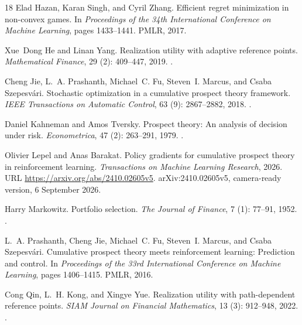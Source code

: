\documentclass[11pt]{article}
\newcommand{\1}{\mathbf 1}
\theoremstyle{definition}
\begin{document}
\begin{thebibliography}{18}
Elad Hazan, Karan Singh, and Cyril Zhang.
\newblock Efficient regret minimization in non-convex games.
\newblock In \emph{Proceedings of the 34th International Conference on Machine
  Learning}, pages 1433--1441. PMLR, 2017.

Xue~Dong He and Linan Yang.
\newblock Realization utility with adaptive reference points.
\newblock \emph{Mathematical Finance}, 29 (2): 409--447,
  2019.
\newblock {}.

Cheng Jie, L.~A. Prashanth, Michael~C. Fu, Steven~I. Marcus, and Csaba
  Szepesv{\'a}ri.
\newblock Stochastic optimization in a cumulative prospect theory framework.
\newblock \emph{IEEE Transactions on Automatic Control}, 63
  (9): 2867--2882, 2018.
\newblock {}.

Daniel Kahneman and Amos Tversky.
\newblock Prospect theory: An analysis of decision under risk.
\newblock \emph{Econometrica}, 47 (2): 263--291, 1979.
\newblock {}.

Olivier Lepel and Anas Barakat.
\newblock Policy gradients for cumulative prospect theory in reinforcement
  learning.
\newblock \emph{Transactions on Machine Learning Research}, 2026.
\newblock URL \url{https://arxiv.org/abs/2410.02605v5}.
\newblock arXiv:2410.02605v5, camera-ready version, 6 September 2026.

Harry Markowitz.
\newblock Portfolio selection.
\newblock \emph{The Journal of Finance}, 7 (1): 77--91, 1952.
\newblock {}.

L.~A. Prashanth, Cheng Jie, Michael~C. Fu, Steven~I. Marcus, and Csaba
  Szepesv{\'a}ri.
\newblock Cumulative prospect theory meets reinforcement learning: Prediction
  and control.
\newblock In \emph{Proceedings of the 33rd International Conference on Machine
  Learning}, pages 1406--1415. PMLR, 2016.

Cong Qin, L.~H. Kong, and Xingye Yue.
\newblock Realization utility with path-dependent reference points.
\newblock \emph{SIAM Journal on Financial Mathematics}, 13
  (3): 912--948, 2022.
\newblock {}.


\end{thebibliography}
\end{document}
